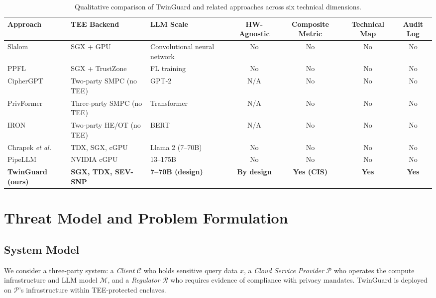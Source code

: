 \documentclass{ieeeaccess}
\begin{document}
\begin{table}[t]
\caption{Qualitative comparison of TwinGuard and related approaches across six
technical dimensions.}
\label{tab:related}
{\renewcommand{\arraystretch}{1.12}
\begin{tabularx}{\textwidth}{l L L C C C C}
\toprule
\textbf{Approach} & \textbf{TEE Backend} & \textbf{LLM Scale} &
\textbf{HW-Agnostic} & \textbf{Composite Metric} &
\textbf{Technical Map} & \textbf{Audit Log} \\
\midrule
Slalom \cite{tramer2019slalom}           & SGX + GPU        & Convolutional neural network & No  & No  & No  & No  \\
PPFL \cite{mo2021ppfl}                  & SGX + TrustZone  & FL training  & No  & No  & No  & No  \\
CipherGPT \cite{dong2023ciphergpt}      & Two-party SMPC (no TEE) & GPT-2    & N/A & No  & No  & No  \\
PrivFormer \cite{akimoto2023privformer} & Three-party SMPC (no TEE) & Transformer   & N/A & No  & No  & No  \\
IRON \cite{hao2022iron}                 & Two-party HE/OT (no TEE) & BERT  & N/A & No  & No  & No  \\
Chrapek \emph{et al.} \cite{chrapek2025confidential} & TDX, SGX, cGPU & Llama 2 (7--70B) & No & No & No & No \\
PipeLLM \cite{tan2024pipellm}           & NVIDIA cGPU      & 13--175B & No & No & No & No \\
\midrule
\textbf{TwinGuard (ours)}               & \textbf{SGX, TDX, SEV-SNP} & \textbf{7--70B (design)} &
\textbf{By design} & \textbf{Yes (CIS)} & \textbf{Yes} & \textbf{Yes} \\
\bottomrule
\end{tabularx}
}
\end{table}

\section{Threat Model and Problem Formulation}
\label{sec:tm}

\subsection{System Model}

We consider a three-party system: a \emph{Client} $\mathcal{C}$ who holds
sensitive query data $x$, a \emph{Cloud Service Provider} $\mathcal{P}$ who
operates the compute infrastructure and LLM model $\mathcal{M}$, and a
\emph{Regulator} $\mathcal{R}$ who requires evidence of compliance with
privacy mandates. TwinGuard is deployed on $\mathcal{P}$'s infrastructure
within TEE-protected enclaves.
\end{document}
